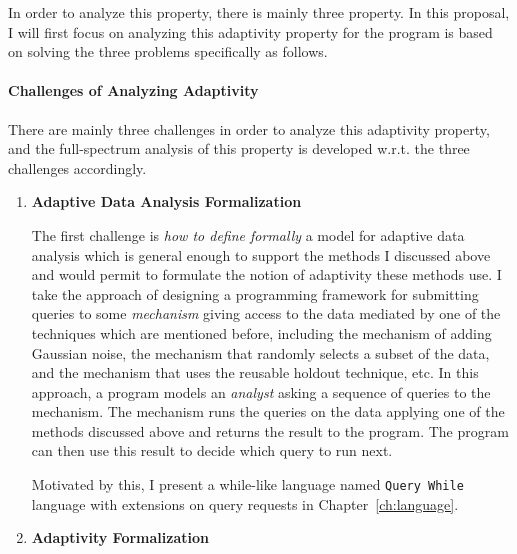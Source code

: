 In order to analyze this property, there is mainly three property. 
In this proposal, I will first focus on analyzing 
this adaptivity property for the program is based on solving the three problems specifically as follows.

\paragraph{Challenges of Analyzing Adaptivity}
\label{sec:intro-challenge}
There are mainly three challenges in order to analyze this adaptivity property, 
and the full-spectrum analysis of this property is 
developed w.r.t. the three challenges accordingly.

\begin{enumerate}
 \item
 \textbf{Adaptive Data Analysis Formalization}

The first challenge is \emph{how to define formally} a model for adaptive data analysis which is general enough to support the methods I discussed above and would permit to formulate the notion of adaptivity these methods use. 
I take the approach of designing a programming framework for submitting queries to some \emph{mechanism} giving access 
to the data mediated by one of the techniques which are mentioned before, 
including the mechanism of adding Gaussian noise, 
the mechanism that randomly selects a subset of the data, 
and the mechanism that uses the reusable holdout technique, etc. 
In this approach, a program models an \emph{analyst} asking a sequence of queries to the mechanism. 
The mechanism runs the queries on the data applying one of the methods discussed above and returns the result to the program. The program can then use this result to decide which query to run next. 

Motivated by this, I present a while-like language 
named {\tt Query While} language with extensions on query requests in Chapter~\ref{ch:language}.

\item 
\textbf{Adaptivity Formalization}


\end{enumerate}
